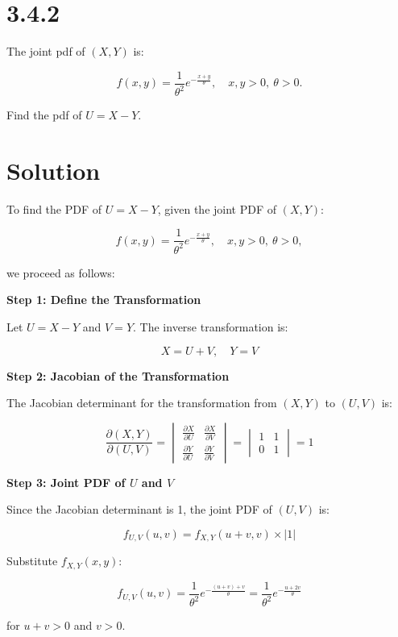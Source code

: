 \documentclass{article}
\begin{document}
\section*{3.4.2}

The joint pdf of \((X, Y)\) is:

\[
f(x, y) = \frac{1}{\theta^2} e^{-\frac{x+y}{\theta}}, \quad x, y > 0, \ \theta > 0.
\]

Find the pdf of \(U = X - Y\).


\section*{Solution}

To find the PDF of \(U = X - Y\), given the joint PDF of \((X, Y)\):

\[
f(x, y) = \frac{1}{\theta^2} e^{-\frac{x+y}{\theta}}, \quad x, y > 0, \ \theta > 0,
\]

we proceed as follows:

\textbf{Step 1: Define the Transformation}

Let \( U = X - Y \) and \( V = Y \). The inverse transformation is:

\[
X = U + V, \quad Y = V
\]

\textbf{Step 2: Jacobian of the Transformation}

The Jacobian determinant for the transformation from \((X, Y)\) to \((U, V)\) is:

\[
\frac{\partial (X, Y)}{\partial (U, V)} = 
\begin{vmatrix}
\frac{\partial X}{\partial U} & \frac{\partial X}{\partial V} \\
\frac{\partial Y}{\partial U} & \frac{\partial Y}{\partial V}
\end{vmatrix}
=
\begin{vmatrix}
1 & 1 \\
0 & 1
\end{vmatrix}
= 1
\]

\textbf{Step 3: Joint PDF of \(U\) and \(V\)}

Since the Jacobian determinant is 1, the joint PDF of \((U, V)\) is:

\[
f_{U,V}(u, v) = f_{X,Y}(u+v, v) \times |1|
\]

Substitute \(f_{X,Y}(x, y)\):

\[
f_{U,V}(u, v) = \frac{1}{\theta^2} e^{-\frac{(u+v) + v}{\theta}} = \frac{1}{\theta^2} e^{-\frac{u + 2v}{\theta}}
\]

for \(u + v > 0\) and \(v > 0\).
\end{document}
